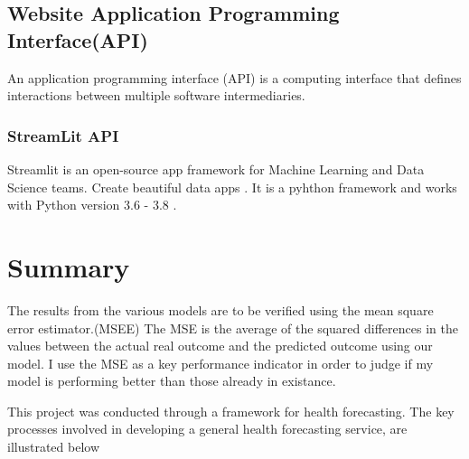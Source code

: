 \documentclass[12pt]{report}
\begin{document}
\subsection{Website Application Programming Interface(API)}
An application programming interface (API) is a computing interface that defines interactions between multiple software intermediaries. 

\subsubsection{StreamLit API}
Streamlit is an open-source app framework for Machine Learning and Data Science teams. Create beautiful data apps .\cite{19}
It is a pyhthon framework and works with Python version 3.6 - 3.8 .

\section{Summary}

The results from the various models are to be verified using the mean square error estimator.(MSEE) The MSE is the average of the squared  differences in the values between the actual real outcome and the predicted outcome using our model. I use the MSE as a key performance indicator in order to judge if my model is performing better than those already in existance.

This project was conducted through a framework for health forecasting. The key processes
involved in developing a general health forecasting service, are illustrated below
\end{document}

